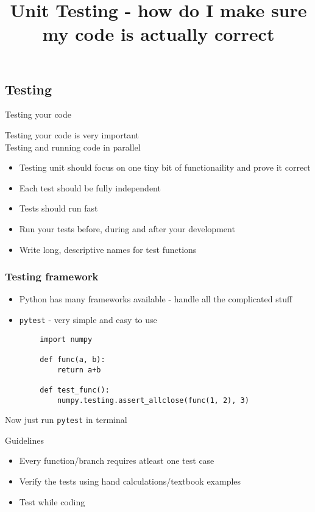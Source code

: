 \documentclass[11pt,professionalfonts]{beamer}
\title[Unit Testing]{\large \textbf{Unit Testing - how do I make sure my code is actually correct}}
\author{\vspace*{-0.3cm}}
\institute{
  \footnotesize
  {\normalsize\bf{Shankar Kulumani}}\\
  \vspace*{0.2cm}
    \textbf{Flight Dynamics \& Control Lab}\\ \vspace*{0.5cm}
  \begin{figure} %
        \texttt{[image: figures/gw\_txh\_2cs\_pos.pdf]}
    \end{figure}
}
\date{}
\begin{document}

\setcounter{framenumber}{-1}
\begin{frame} %
  \titlepage
\end{frame}   %

\section*{}
\subsection*{Testing}  
\begin{frame}{Testing your code}
    \begin{alertblock}{}
        \centering 
        Testing your code is very important \\
        Testing and running code in parallel
    \end{alertblock}
    \pause
    \begin{itemize}
        \item Testing unit should focus on one tiny bit of functionaility and prove it correct
        \item Each test should be fully independent
        \item Tests should run fast
        \item Run your tests before, during and after your development
        \item Write long, descriptive names for test functions
    \end{itemize}
\end{frame}

\begin{frame}[fragile]\frametitle{Testing framework}
    \begin{itemize}
        \item Python has many frameworks available - handle all the complicated stuff
        \item \texttt{pytest} - very simple and easy to use
    \end{itemize}
    \begin{verbatim}
        import numpy

        def func(a, b):
            return a+b

        def test_func():
            numpy.testing.assert_allclose(func(1, 2), 3)

    \end{verbatim}
    \pause
    \begin{alertblock}{}
        Now just run \texttt{pytest} in terminal
    \end{alertblock}
\end{frame}

\begin{frame}{Guidelines}
    \begin{itemize}
        \item Every function/branch requires atleast one test case
        \item Verify the tests using hand calculations/textbook examples
        \item Test while coding
    \end{itemize}
\end{frame}
\end{document}
